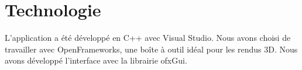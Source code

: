 \chapter{Technologie}
\label{s:technologie}

L’application a été développé en C++ avec Visual Studio. Nous avons choisi de travailler avec OpenFrameworks, une boîte à outil idéal pour les rendus 3D. Nous avons développé l’interface avec la librairie ofxGui.